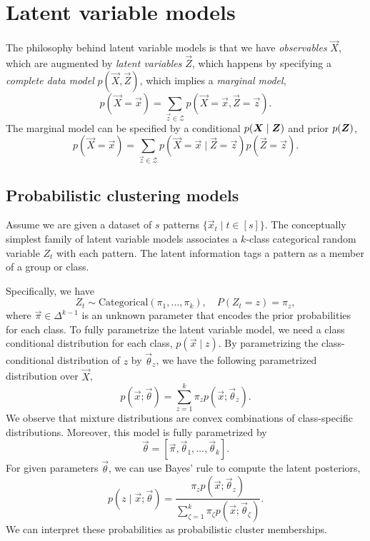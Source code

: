 \section{Latent variable models}

The philosophy behind latent variable models is that we have \textit{observables} $\vec{X}$, which
are augmented by \textit{latent variables} $\vec{Z}$, which happens by specifying a
\textit{complete data model} $p(\vec{X}, \vec{Z})$, which implies a \textit{marginal model}, \[
    p(\vec{X} = \vec{x}) = \sum_{\vec{z} \in \mathcal{Z}} p(\vec{X} = \vec{x}, \vec{Z} = \vec{z}).
\]
The marginal model can be specified by a conditional $p(\bm{X} \mid \bm{Z})$ and prior
$p(\bm{Z})$, \[
    p(\vec{X} = \vec{x}) = \sum_{\vec{z} \in \mathcal{Z}} p(\vec{X} = \vec{x} \mid \vec{Z} = \vec{z}) p(\vec{Z} = \vec{z}).
\]

\subsection{Probabilistic clustering models}

Assume we are given a dataset of $s$ patterns $\{ \vec{x}_t \mid t \in [s] \}$. The conceptually
simplest family of latent variable models associates a $k$-class categorical random variable $Z_t$
with each pattern. The latent information tags a pattern as a member of a group or class.

Specifically, we have \[
    Z_t \sim \mathrm{Categorical}(\pi_1, \ldots, \pi_k), \quad P(Z_t = z) = \pi_z,
\]
where $\vec{\pi} \in \Delta^{k-1}$ is an unknown parameter that encodes the prior probabilities for
each class. To fully parametrize the latent
variable model, we need a class conditional distribution for each class, $p(\vec{x} \mid z)$. By
parametrizing the class-conditional distribution of $z$ by $\vec{\theta}_z$, we have the following
parametrized distribution over $\vec{X}$, \[
    p(\vec{x}; \vec{\theta}) = \sum_{z=1}^{k} \pi_z p(\vec{x}; \vec{\theta}_z).
\]
We observe that mixture distributions are convex combinations of class-specific distributions.
Moreover, this model is fully parametrized by \[
    \vec{\theta} = [\vec{\pi}, \vec{\theta}_1, \ldots, \vec{\theta}_k].
\]
For given parameters $\vec{\theta}$, we can use Bayes' rule to compute the latent posteriors, \[
    p(z \mid \vec{x}; \vec{\theta}) = \frac{\pi_z p(\vec{x}; \vec{\theta}_z)}{\sum_{\zeta=1}^{k} \pi_{\zeta} p(\vec{x}; \vec{\theta}_{\zeta})}.
\]
We can interpret these probabilities as probabilistic cluster memberships.

